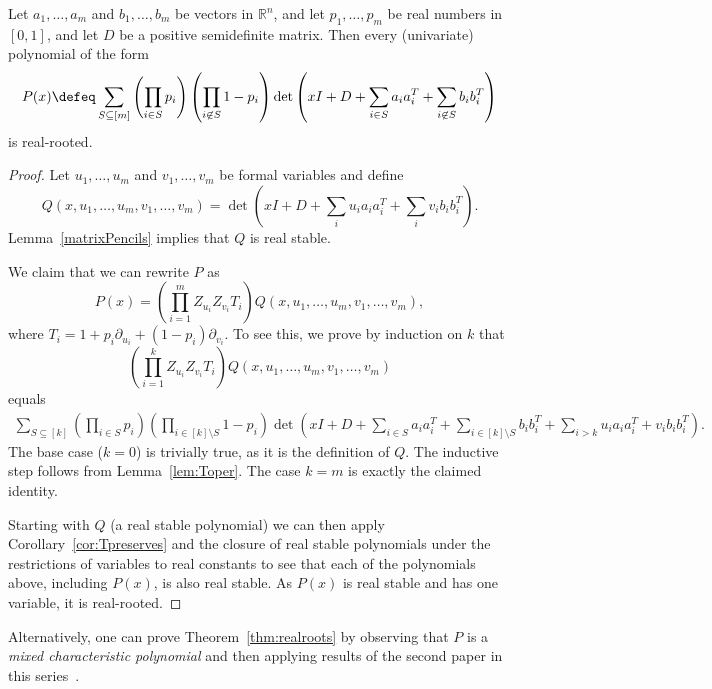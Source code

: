 \documentclass[11pt]{article}
\newcommand{\R}{\mathbb{R}}
\newcommand{\mydet}[1]{\det\left(#1\right)}
\begin{document}
\begin{theorem} \label{thm:realroots}
Let $a_{1}, \dotsc , a_{m}$ and $b_{1}, \dotsc , b_{m}$ be vectors in $\R^n$, 
and let $p_{1}, \dotsc , p_{m}$ be real numbers in $[0,1]$,
  and let $D$ be a positive semidefinite matrix.
Then every (univariate) polynomial of the form 
$$
  P(x) \defeq \sum_{S \subseteq [m]}
  \left( \prod_{i\in S}{p_{i}} \right)
  \left( \prod_{i \not \in S}{1-p_{i}} \right)
  \mydet{x I + D + \sum_{i \in S} a_{i} a_{i}^{T} + \sum_{i \not \in S} b_{i} b_{i}^{T}}
$$
is real-rooted.
\end{theorem}
\begin{proof}
Let $u_1, \dots, u_m$ and $v_1, \dots, v_m$ be formal variables and define
$$
Q(x, u_1,\ldots,u_m,v_1,\ldots,v_m) = \mydet{xI + D + \sum_{i} u_{i} a_{i} a_{i}^{T} + \sum_{i} v_{i} b_{i} b_{i}^{T}}.
$$
Lemma~\ref{matrixPencils} implies that $Q$ is real stable.

We claim that we can rewrite $P$ as 
\[
P (x) = 
\left(
  \prod_{i=1}^{m} 
Z_{u_{i}} Z_{v_{i}}
T_{i}
 \right) 
Q(x, u_1,\ldots,u_m,v_1,\ldots,v_m)
,
\]
where $T_{i} = 1 + p_{i} \partial_{u_{i}} + (1-p_{i}) \partial_{v_{i}}$.
To see this, we prove by induction on $k$ that
\[
\left(
  \prod_{i=1}^{k} Z_{u_{i}} Z_{v_{i}} T_{i}
 \right) 
Q(x, u_1,\ldots,u_m,v_1,\ldots,v_m)
\]
equals
\begin{multline*}
 \sum_{S \subseteq [k]}
  \left( \prod_{i\in S}{p_{i}} \right)
  \left( \prod_{i \in [k] \setminus S}{1-p_{i}} \right) 
  \mydet{x I + D + \sum_{i \in S} a_{i} a_{i}^{T} + \sum_{i \in [k] \setminus S} b_{i} b_{i}^{T}
  + \sum_{i > k} u_{i} a_{i} a_{i}^{T}
  + v_{i} b_{i} b_{i}^{T}
}.
\end{multline*}
The base case ($k = 0$) is trivially true, as it is the definition of $Q$.
The inductive step follows from Lemma~\ref{lem:Toper}.
The case $k = m$ is exactly the claimed identity.

Starting with $Q$ (a real stable polynomial) we can then apply Corollary~\ref{cor:Tpreserves} and the closure of real stable polynomials under the restrictions of variables to real constants to see that each of the polynomials above, including $P(x)$, is also real stable.
As $P(x)$ is real stable and has one variable, it is real-rooted. 
\end{proof}

Alternatively, one can prove Theorem~\ref{thm:realroots} 
  by observing that $P$ is a \textit{mixed characteristic polynomial}
  and then applying results of the second paper in this series~\cite{IF2}.
\end{document}
